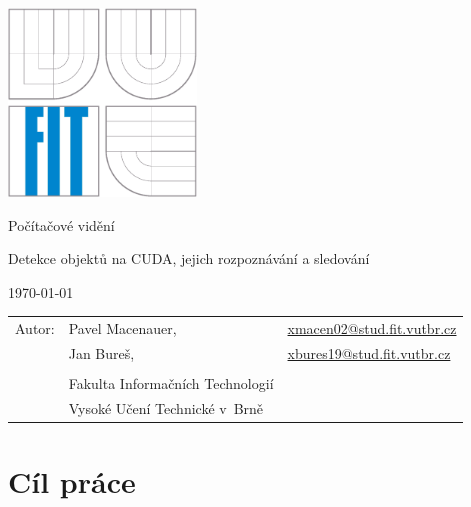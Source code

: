 \documentclass[12pt,a4paper,titlepage,final]{report}
\makeatletter
\newcommand\Course{Počítačové vidění}
\newcommand\WorkTitle{Detekce objektů na CUDA, jejich rozpoznávání a sledování}
\newcommand\AuthorA{Pavel Macenauer}
\newcommand\AuthorB{Jan Bureš}
\newcommand\AuthorAEmail{xmacen02@stud.fit.vutbr.cz}
\newcommand\AuthorBEmail{xbures19@stud.fit.vutbr.cz}
\newcommand\Faculty{Fakulta Informačních Technologií}
\newcommand\School{Vysoké Učení Technické v~Brně}
\makeatother
\begin{document}
	\begin{titlepage}
	\begin{center}
		\includegraphics[height=5cm]{images/logo.eps}
	\end{center}
	\vfill
	\begin{center}
		\begin{Large}
			\Course\\
		\end{Large}
		\bigskip
		\begin{Huge}
			\WorkTitle\\
		\end{Huge}
	\end{center}
	\vfill
	\begin{center}
		\begin{large}
			\today
		\end{large}
	\end{center}
	\vfill
	\begin{flushleft}
		\begin{large}
			\begin{tabular}{lll}
				Autor: & \AuthorA, & \url{\AuthorAEmail} \\
				& \AuthorB, & \url{\AuthorBEmail} \\
		
				& & \\
				& \Faculty \\
				& \School \\
			\end{tabular}
		\end{large}
	\end{flushleft}
\end{titlepage}		

\tableofcontents

\newpage

\section{Cíl práce}
\end{document}
